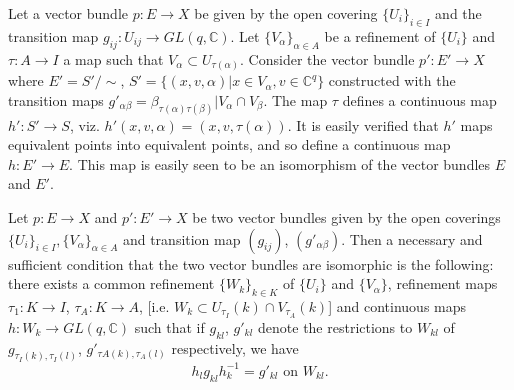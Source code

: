 \begin{remark*}
  Let a vector bundle $p: E \to X$ be given by the open covering $\{
  U_i\}_{i \in I}$ and the transition map $g_{ij}:U_{ij}\to GL (q,
  \mathbb{C})$. Let $\{ V_\alpha \}_{\alpha \in A}$ be a refinement of
  $\{ U_i \}$ and $\tau :A \to I$ a map such that $V_\alpha \subset
  U_{\tau(\alpha)}$. Consider the vector bundle $p' :E' \to X$ where
  $E' =S'/\sim$, $S'= \{ (x,v, \alpha)| x \in V_\alpha, v \in
  \mathbb{C}^q\}$ constructed with the transition maps $g'_{\alpha
    \beta}=\beta_{\tau(\alpha)\tau(\beta)} | V_\alpha \cap V_
  \beta$. The map $\tau$ defines a continuous map $h':S' \to S$,
  viz. $h' (x,v, \alpha)=(x,v,\tau (\alpha))$. It is easily verified
  that $h'$ maps equivalent points into equivalent points, and so
  define a continuous map $h:E' \to E$. This map is easily seen to be
  an isomorphism of the vector bundles $E$ and $E'$.  
\end{remark*}

\setcounter{proposition}{0}
\begin{proposition}\label{chap3:sec1:prop1}%
  Let $p:E \to X$ and $p':E' \to X$ be two vector bundles given by
  the open coverings $\{ U_i\}_{i \in I}, \{ V_\alpha \}_{\alpha \in
    A}$ and transition map $(g_{ij})$, $(g'_{\alpha \beta})$. Then a
  necessary and sufficient condition that the two vector bundles are
  isomorphic is the following: there exists a common refinement $\{
  W_k \}_{k \in K}$ of $\{ U_i \}$ and $\{V_\alpha \}$, refinement
  maps $\tau_1:K \to I$, $\tau_A:K \to A$, [i.e. $W_k \subset
    U_{\tau_I}(k)\cap V_{\tau_A}(k)$] and continuous maps\pageoriginale $h :W_k
  \to GL(q, \mathbb{C})$ such that if $g_{kl}$, $g'_{kl}$ denote the
  restrictions to $W_{kl}$ of $g_{\tau_I (k),\tau_I (l)}$, $g'_{\tau
    A(k), \tau_A (l)}$ respectively, we have 
  $$
  h_l g_{kl} h^{-1}_k=g'_{kl} \text{ on } W_{kl}.
  $$
\end{proposition}

